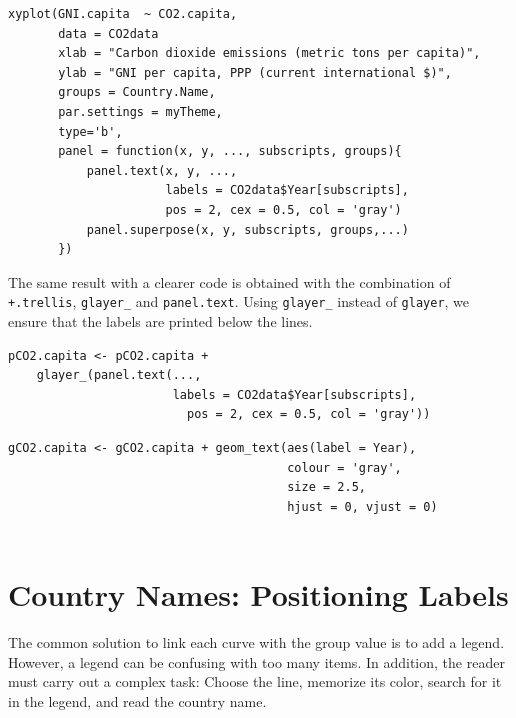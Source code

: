 

\lstset{language=r,label= ,caption= ,captionpos=b,numbers=none}
\begin{lstlisting}
xyplot(GNI.capita  ~ CO2.capita,
       data = CO2data
       xlab = "Carbon dioxide emissions (metric tons per capita)",
       ylab = "GNI per capita, PPP (current international $)",
       groups = Country.Name,
       par.settings = myTheme,
       type='b',
       panel = function(x, y, ..., subscripts, groups){
           panel.text(x, y, ...,
                      labels = CO2data$Year[subscripts],
                      pos = 2, cex = 0.5, col = 'gray')
           panel.superpose(x, y, subscripts, groups,...)
       })
\end{lstlisting}

The same result with a clearer code is obtained with the combination
of \texttt{+.trellis}, \texttt{glayer\_} and \texttt{panel.text}. Using \texttt{glayer\_} instead of
\texttt{glayer}, we ensure that the labels are printed below the lines.


\lstset{language=r,label= ,caption= ,captionpos=b,numbers=none}
\begin{lstlisting}
pCO2.capita <- pCO2.capita +
    glayer_(panel.text(...,
                       labels = CO2data$Year[subscripts],
                         pos = 2, cex = 0.5, col = 'gray'))
\end{lstlisting}

\lstset{language=r,label= ,caption= ,captionpos=b,numbers=none}
\begin{lstlisting}
gCO2.capita <- gCO2.capita + geom_text(aes(label = Year),
                                       colour = 'gray',
                                       size = 2.5,
                                       hjust = 0, vjust = 0)
  
\end{lstlisting}

\section{Country Names: Positioning Labels}
\label{sec:org974853f}
The common solution to link each curve with the group value is to add
a legend. However, a legend can be confusing with too many items. In
addition, the reader must carry out a complex task: Choose the line,
memorize its color, search for it in the legend, and read the country
name.

